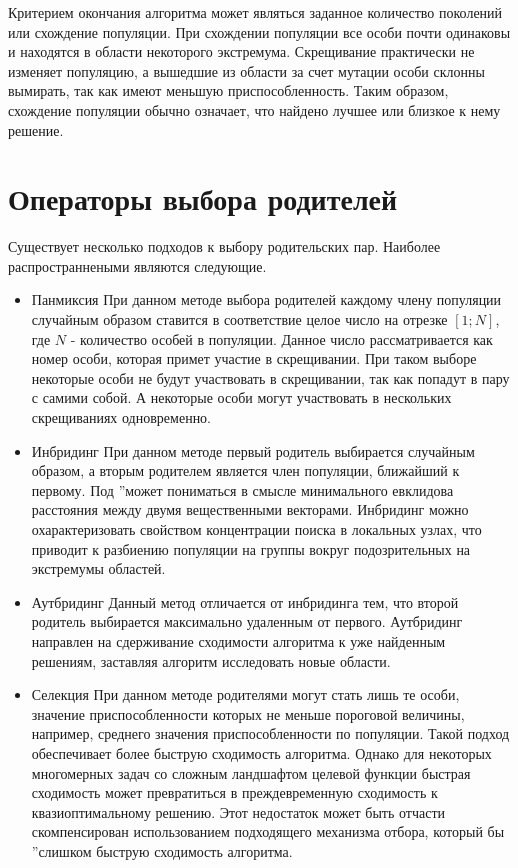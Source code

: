 \begin{itemize}
Критерием окончания алгоритма может являться заданное количество поколений или схождение популяции.
При схождении популяции все особи почти одинаковы и находятся в области некоторого экстремума. Скрещивание практически не изменяет популяцию, а вышедшие из области за счет мутации особи склонны вымирать, так как имеют меньшую приспособленность. Таким образом, схождение популяции обычно означает, что найдено лучшее или близкое к нему решение.

\section{Операторы выбора родителей}
Существует несколько подходов к выбору родительских пар. Наиболее распространнеными являются следующие.
\begin{itemize}[label=$\ast$]
	\item Панмиксия
При данном методе выбора родителей каждому члену популяции случайным образом ставится в соответствие целое число на отрезке $[1; N]$, где $N$ - количество особей в популяции. Данное число рассматривается как номер особи, которая примет участие в скрещивании. При таком выборе некоторые особи не будут участвовать в скрещивании, так как попадут в пару с самими собой. А некоторые особи могут участвовать в нескольких скрещиваниях одновременно.
	\item Инбридинг
При данном методе первый родитель выбирается случайным образом, а вторым родителем является член популяции, ближайший к первому. Под \textquotedblright может пониматься в смысле минимального евклидова расстояния между двумя вещественными векторами.
Инбридинг можно охарактеризовать свойством концентрации поиска в локальных узлах, что приводит к разбиению популяции на группы вокруг подозрительных на экстремумы областей.
	\item Аутбридинг
Данный метод отличается от инбридинга тем, что второй родитель выбирается максимально удаленным от первого.
Аутбридинг направлен на сдерживание сходимости алгоритма к уже найденным решениям, заставляя алгоритм исследовать новые области.
	\item Селекция
При данном методе родителями могут стать лишь те особи, значение приспособленности которых не меньше пороговой величины, например, среднего значения приспособленности по популяции. Такой подход обеспечивает более быструю сходимость алгоритма. Однако для некоторых многомерных задач со сложным ландшафтом целевой функции быстрая сходимость может превратиться в преждевременную сходимость к квазиоптимальному решению. Этот недостаток может быть отчасти скомпенсирован использованием подходящего механизма отбора, который бы \textquotedblright слишком быструю сходимость алгоритма.

\end{itemize}
\end{itemize}
